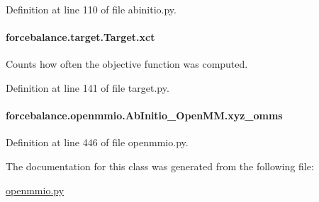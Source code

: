 Definition at line 110 of file abinitio.\-py.

\hypertarget{classforcebalance_1_1target_1_1Target_aad2e385cfbf7b4a68f1c2cb41133fe82}{
\paragraph[{xct}]{\setlength{\rightskip}{0pt plus 5cm}forcebalance.\-target.\-Target.\-xct\hspace{0.3cm}{\ttfamily [inherited]}}}\label{classforcebalance_1_1target_1_1Target_aad2e385cfbf7b4a68f1c2cb41133fe82}


Counts how often the objective function was computed. 



Definition at line 141 of file target.\-py.

\hypertarget{classforcebalance_1_1openmmio_1_1AbInitio__OpenMM_a355176032e08dff544b81a12d8e82a9e}{
\paragraph[{xyz\-\_\-omms}]{\setlength{\rightskip}{0pt plus 5cm}forcebalance.\-openmmio.\-Ab\-Initio\-\_\-\-Open\-M\-M.\-xyz\-\_\-omms}}\label{classforcebalance_1_1openmmio_1_1AbInitio__OpenMM_a355176032e08dff544b81a12d8e82a9e}


Definition at line 446 of file openmmio.\-py.



The documentation for this class was generated from the following file\-:\begin{DoxyCompactItemize}
\item 
\hyperlink{openmmio_8py}{openmmio.\-py}\end{DoxyCompactItemize}
